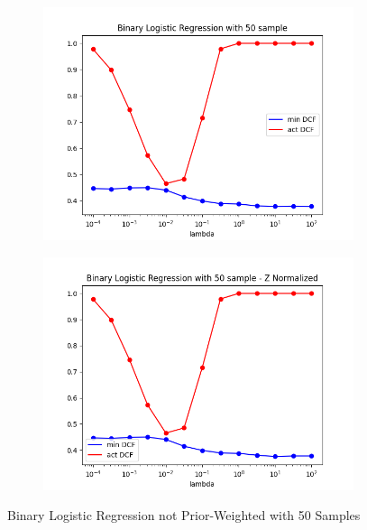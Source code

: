 \begin{figure}[h!]
\begin{subfigure}[b]{0.40\linewidth}
        \includegraphics[width=\linewidth]{Lab/08. Lab 08/Images/07. BLR - minAndactDCF 50 Samples}
        \label{fig:BLR50SminAndactDCF}
    \end{subfigure}
    \begin{subfigure}[b]{0.40\linewidth}
        \includegraphics[width=\linewidth]{Lab/08. Lab 08/Images/08. BLR - minAndactDCF 50 Samples - ZNormalized}
        \label{fig:minAndactDCFZNorm}
    \end{subfigure}
    \caption{Binary Logistic Regression not Prior-Weighted with 50 Samples}
    \label{fig:BLR50Samples}
\end{figure}


